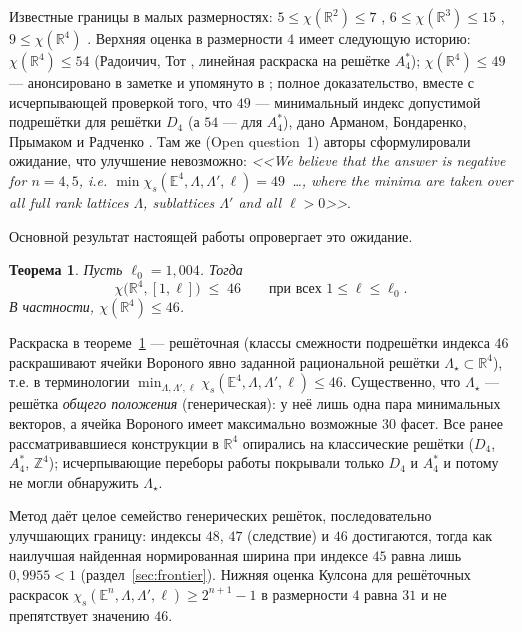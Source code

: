 \documentclass[12pt]{article}
\newtheorem{theorem}{Теорема}
\theoremstyle{definition}
\theoremstyle{remark}
\newcommand{\R}{\mathbb{R}}
\newcommand{\Z}{\mathbb{Z}}
\newcommand{\E}{\mathbb{E}}
\begin{document}
Известные границы в малых размерностях:
$5\le\chi(\R^2)\le 7$ \cite{deGrey,Soifer},
$6\le\chi(\R^3)\le 15$ \cite{Nechushtan,Coulson},
$9\le\chi(\R^4)$ \cite{ExooIsmailescu}. Верхняя оценка в размерности $4$
имеет следующую историю: $\chi(\R^4)\le 54$ (Радоичич, Тот \cite{RadoicicToth},
линейная раскраска на решётке $A_4^*$); $\chi(\R^4)\le 49$ --- анонсировано в
заметке \cite{Ivanov2006} и упомянуто в \cite{CoulsonPayne2007}; полное
доказательство, вместе с исчерпывающей проверкой того, что $49$ ---
минимальный индекс допустимой подрешётки для решётки $D_4$ (а $54$ --- для
$A_4^*$), дано Арманом, Бондаренко, Прымаком и Радченко \cite{ABPR}. Там же
(Open question~1) авторы сформулировали ожидание, что улучшение невозможно:
\emph{<<We believe that the answer is negative for $n=4,5$, i.e.
$\min\chi_s(\E^4,\Lambda,\Lambda',\ell)=49$~\ldots, where the minima are taken
over all full rank lattices $\Lambda$, sublattices $\Lambda'$ and all
$\ell>0$>>}.

Основной результат настоящей работы опровергает это ожидание.

\begin{theorem}\label{thm:main}
Пусть $\ell_0=1{,}004$. Тогда
\[
\chi\bigl(\R^4,[1,\ell]\bigr)\;\le\;46
\qquad\text{при всех }1\le\ell\le\ell_0 .
\]
В частности, $\chi(\R^4)\le 46$.
\end{theorem}

Раскраска в теореме~\ref{thm:main} --- решёточная (классы смежности подрешётки
индекса $46$ раскрашивают ячейки Вороного явно заданной рациональной решётки
$\Lambda_\star\subset\R^4$), т.е. в терминологии \cite{ABPR}
$\min_{\Lambda,\Lambda',\ell}\chi_s(\E^4,\Lambda,\Lambda',\ell)\le 46$.
Существенно, что $\Lambda_\star$ --- решётка \emph{общего положения}
(генерическая): у неё лишь одна пара минимальных векторов, а ячейка Вороного
имеет максимально возможные $30$ фасет. Все ранее рассматривавшиеся
конструкции в $\R^4$ опирались на классические решётки ($D_4$, $A_4^*$,
$\Z^4$); исчерпывающие переборы работы \cite{ABPR} покрывали только $D_4$ и
$A_4^*$ и потому не могли обнаружить $\Lambda_\star$.

Метод даёт целое семейство генерических решёток, последовательно улучшающих
границу: индексы $48$, $47$ (следствие) и $46$ достигаются, тогда как наилучшая
найденная нормированная ширина при индексе $45$ равна лишь $0{,}9955<1$
(раздел~\ref{sec:frontier}). Нижняя оценка Кулсона для решёточных раскрасок
$\chi_s(\E^n,\Lambda,\Lambda',\ell)\ge 2^{n+1}-1$ \cite{Coulson,ABPR} в
размерности $4$ равна $31$ и не препятствует значению $46$.
\end{document}
